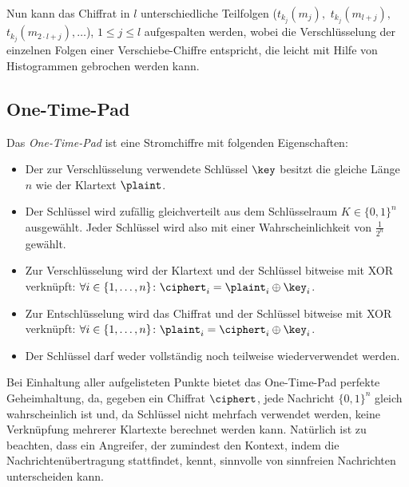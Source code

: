 Nun kann das Chiffrat in $l$ unterschiedliche Teilfolgen ($t_{k_j}(m_j),$ $t_{k_j}(m_{l+j}),$ $t_{k_j}(m_{2 \cdot l+j}),\ldots$), $1 \leq j \leq l$ aufgespalten werden, wobei die Verschlüsselung der einzelnen Folgen einer Verschiebe-Chiffre entspricht, die leicht mit Hilfe von Histogrammen gebrochen werden kann.

\subsection{One-Time-Pad}
\label{ssec:otp}
Das \emph{One-Time-Pad} ist eine Stromchiffre mit folgenden Eigenschaften:
\begin{itemize}
	\item Der zur Verschlüsselung verwendete Schlüssel $\key$ besitzt die gleiche Länge $n$ wie der Klartext $\plaint$.
	\item Der Schlüssel wird zufällig gleichverteilt aus dem Schlüsselraum $K \in \{0,1\}^{n}$ ausgewählt. Jeder Schlüssel wird also mit einer Wahrscheinlichkeit von $\frac{1}{2^{n}}$ gewählt.
 	\item Zur Verschlüsselung wird der Klartext und der Schlüssel bitweise mit XOR verknüpft: $\forall i \in \{1,\dots,n\}\colon \ciphert_i = \plaint_i\oplus\key_i$.
 	\item Zur Entschlüsselung wird das Chiffrat und der Schlüssel bitweise mit XOR verknüpft: $\forall i \in \{1,\dots,n\}\colon \plaint_i = \ciphert_i\oplus\key_i$.
  	\item Der Schlüssel darf weder vollständig noch teilweise wiederverwendet werden.
\end{itemize}
Bei Einhaltung aller aufgelisteten Punkte bietet das One-Time-Pad perfekte Geheimhaltung, da, gegeben ein Chiffrat $\ciphert$, jede Nachricht $\{0,1\}^{n}$ gleich wahrscheinlich ist und, da Schlüssel nicht mehrfach verwendet werden, keine Verknüpfung mehrerer Klartexte berechnet werden kann. Natürlich ist zu beachten, dass ein Angreifer, der zumindest den Kontext, indem die Nachrichtenübertragung stattfindet, kennt, sinnvolle von sinnfreien Nachrichten unterscheiden kann.

